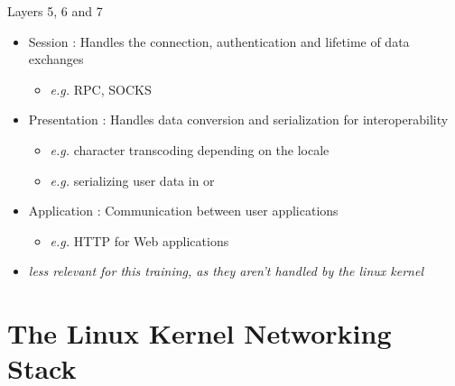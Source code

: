 \begin{frame}{Layers 5, 6 and 7}
	\begin{itemize}
		\item Session : Handles the connection, authentication and lifetime of data exchanges
			\begin{itemize}
				\item \textit{e.g.} RPC, SOCKS
			\end{itemize}
		\item Presentation : Handles data conversion and serialization for interoperability
			\begin{itemize}
				\item \textit{e.g.} character transcoding depending on the locale
				\item \textit{e.g.} serializing user data in  or 
			\end{itemize}
		\item Application : Communication between user applications
			\begin{itemize}
				\item \textit{e.g.} HTTP for Web applications
			\end{itemize}
		\item \textit{less relevant for this training, as they aren't handled by the linux kernel}
	\end{itemize}
\end{frame}

\section{The Linux Kernel Networking Stack}

